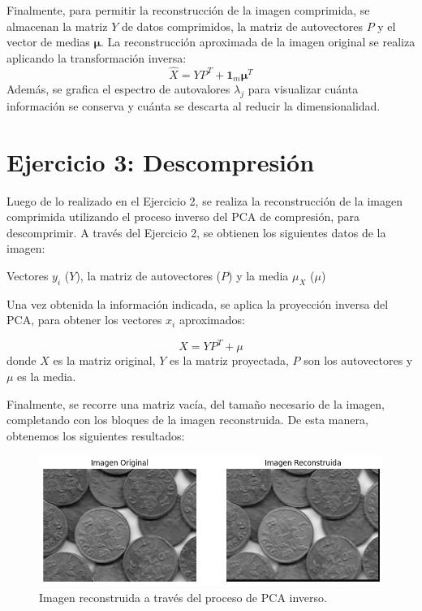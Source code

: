 \documentclass[a4paper,12pt]{article}
\begin{document}
\vspace{1em}

Finalmente, para permitir la reconstrucción de la imagen comprimida, se almacenan la matriz $Y$ de datos comprimidos, la matriz de autovectores $P$ y el vector de medias $\boldsymbol{\mu}$. La reconstrucción aproximada de la imagen original se realiza aplicando la transformación inversa:
\[
\hat{X} = Y P^T + \mathbf{1}_m \boldsymbol{\mu}^T
\]
Además, se grafica el espectro de autovalores $\lambda_j$ para visualizar cuánta información se conserva y cuánta se descarta al reducir la dimensionalidad.

\newpage
\section*{Ejercicio 3: Descompresión}

Luego de lo realizado en el Ejercicio 2, se realiza la reconstrucción de la imagen comprimida utilizando el proceso inverso del PCA de compresión, para descomprimir.
A través del Ejercicio 2, se obtienen los siguientes datos de la imagen:

\vspace{1em}

Vectores \(y_i\) (\(Y\)), la matriz de autovectores (\(P\)) y la media \(\mu_X\) (\(\mu\))

\vspace{1em}

Una vez obtenida la información indicada, se aplica la proyección inversa del PCA, para obtener los vectores \(x_i\) aproximados:

\vspace{1em}

\[
X = Y P^T + \mu
\]
donde \(X\) es la matriz original, \(Y\) es la matriz proyectada, \(P\) son los autovectores y \(\mu\) es la media.

\vspace{1em}

Finalmente, se recorre una matriz vacía, del tamaño necesario de la imagen, completando con los bloques de la imagen reconstruida.
De esta manera, obtenemos los siguientes resultados:

\begin{figure}[H]
    \centering
    \includegraphics[width=1\textwidth]{Ejercicio3.png}
    \caption{Imagen reconstruida a través del proceso de PCA inverso.}
    \label{fig:ej3}
\end{figure}
\end{document}
